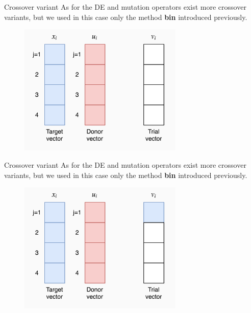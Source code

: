 \documentclass[xcolor={usenames}]{beamer}
\begin{document}
  \begin{frame}{Crossover variant}
	As for the DE and mutation operators exist more crossover variants, but we used in this case only the method \textbf{bin} introduced previously.
	\begin{figure}
		\centering
		\includegraphics[width=0.7\textwidth]{../figures/bin-0.png}
	\end{figure}
  \end{frame}
  
  \begin{frame}{Crossover variant}
	As for the DE and mutation operators exist more crossover variants, but we used in this case only the method \textbf{bin} introduced previously.
	\begin{figure}
		\centering
		\includegraphics[width=0.7\textwidth]{../figures/bin-1.png}
	\end{figure}
  \end{frame}
  
\end{document}
